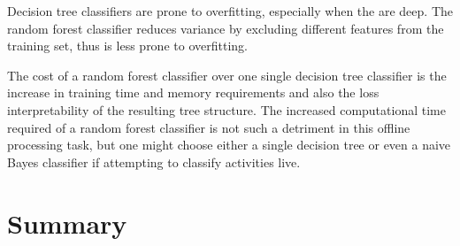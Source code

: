        Decision tree classifiers are prone to overfitting, especially when the are deep. The random forest classifier reduces variance by excluding different features from the training set, thus is less prone to overfitting.
        
        The cost of a random forest classifier over one single decision tree classifier is the increase in training time and memory requirements and also the loss interpretability of the resulting tree structure. The increased computational time required of a random forest classifier is not such a detriment in this offline processing task, but one might choose either a single decision tree or even a naive Bayes classifier if attempting to classify activities live.
  \section{Summary}
